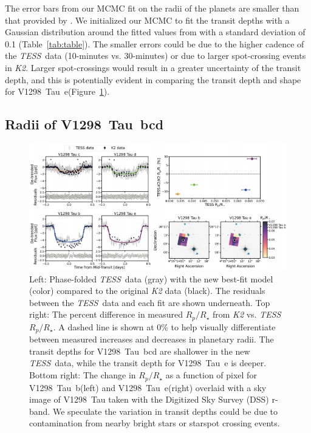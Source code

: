 \documentclass[twocolumn]{aastex631}
\newcommand{\githubicon}{{\color{black}\faGithub}}
\newcommand{\tess}{\textit{TESS}}
\newcommand{\sname}{V1298~Tau\xspace}
\newcommand{\planetb}{V1298~Tau~b\xspace}
\newcommand{\planete}{V1298~Tau~e\xspace}
\newcommand{\planetknown}{V1298~Tau~bcd\xspace}
\begin{document}
The error bars from our MCMC fit on the radii of the planets are smaller than that provided by \cite{David2019b}. We initialized our MCMC to fit the transit depths with a Gaussian distribution around the fitted values from \cite{David2019b} with a standard deviation of 0.1 (Table~\ref{tab:table}). The smaller errors could be due to the higher cadence of the \tess\ data (10-minutes vs. 30-minutes) or due to larger spot-crossing events in \textit{K2}. Larger spot-crossings would result in a greater uncertainty of the transit depth, and this is potentially evident in comparing the transit depth and shape for \planete (Figure~\ref{fig:compare}).


\subsection{Radii of \planetknown}

\begin{figure}[!htb]
\begin{center}
\includegraphics[width=\textwidth,trim={0.25cm 0 0 0}]{static/compare_together.pdf}
\caption{Left: Phase-folded \tess\ data (gray) with the new best-fit model (color) compared to the original \textit{K2} data (black). The residuals between the \tess\ data and each fit are shown underneath. Top right: The percent difference in measured $R_p/R_\star$ from \textit{K2} vs. \tess\ $R_p/R_\star$. A dashed line is shown at 0\% to help visually differentiate between measured increases and decreases in planetary radii. The transit depths for \planetknown are shallower in the new \tess\ data, while the transit depth for \planete is deeper. Bottom right: The change in $R_p/R_\star$ as a function of pixel for \planetb (left) and \planete (right) overlaid with a sky image of \sname taken with the Digitized Sky Survey (DSS) r-band. We speculate the variation in transit depths could be due to contamination from nearby bright stars or starspot crossing events. \href{https://github.com/afeinstein20/v1298tau_tess/blob/main/src/figures/dilution_check.py}{\githubicon}} \label{fig:compare}
\end{center}
\end{figure}
\end{document}
